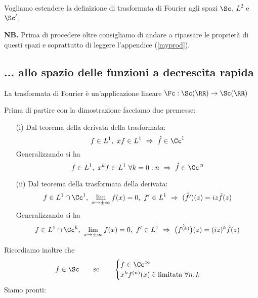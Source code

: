 Vogliamo estendere la definizione di trasformata di Fourier agli spazi $\Sc$, $L^2$ e $\Sc'$.

\textbf{NB.} Prima di procedere oltre consigliamo di andare a ripassare le proprietà di questi spazi e soprattutto di leggere l'appendice (\ref{myprod}).


\subsection{... allo spazio delle funzioni a decrescita rapida}

\begin{thm}
La trasformata di Fourier è un'applicazione lineare $\Fc : \Sc(\RR)\rightarrow \Sc(\RR)$
\end{thm}

Prima di partire con la dimostrazione facciamo due premesse:
\begin{enumerate}
    \item[(i)] Dal teorema della derivata della trasformata:
    \begin{equation*}
    f\in L^1,\ xf\in L^1\ \Rightarrow\ \hat{f}\in\Cc^1
    \end{equation*}
    Generalizzando si ha
    \begin{equation*}
    f\in L^1,\ x^kf\in L^1\ \forall k=0:n\ \Rightarrow\ \hat{f}\in\Cc^{\,n}
    \end{equation*}

    \item[(ii)] Dal teorema della trasformata della derivata:
    \begin{equation*}
    f\in L^1\cap \Cc^1,\ \lim_{x\to\pm\infty} f(x)=0,\ f'\in L^1\ \Rightarrow\ \hat{(f')}(z)=iz\hat{f}(z)
    \end{equation*}
    Generalizzando si ha
    \begin{equation*}
    f\in L^1\cap \Cc^k,\ \lim_{x\to\pm\infty} f(x)=0,\ f'\in L^1\ \Rightarrow\ \hat{\left(f^{(k)}\right)}(z)=(iz)^k\hat{f}(z)
    \end{equation*}
\end{enumerate}

Ricordiamo inoltre che
\begin{equation*}
f\in\Sc\qquad\text{se}\qquad \begin{cases}
f\in\Cc^\infty \\
x^kf^{(n)}(x)\text{ è limitata }\forall n,k
\end{cases}
\end{equation*}
Siamo pronti:

